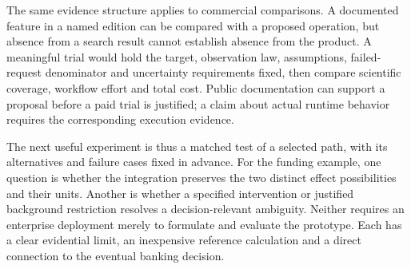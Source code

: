 The same evidence structure applies to commercial comparisons. A documented
feature in a named edition can be compared with a proposed operation, but
absence from a search result cannot establish absence from the product.
A meaningful trial would hold the target, observation law, assumptions,
failed-request denominator and uncertainty requirements fixed, then compare
scientific coverage, workflow effort and total cost. Public documentation
can support a proposal before a paid trial is justified; a claim about
actual runtime behavior requires the corresponding execution evidence.

The next useful experiment is thus a matched test of a selected path, with
its alternatives and failure cases fixed in advance. For the funding example,
one question is whether the integration preserves the two distinct effect
possibilities and their units. Another is whether a specified intervention
or justified background restriction resolves a decision-relevant ambiguity.
Neither requires an enterprise deployment merely to formulate and evaluate
the prototype. Each has a clear evidential limit, an inexpensive reference
calculation and a direct connection to the eventual banking decision.
\label{exec13:survey-end}
